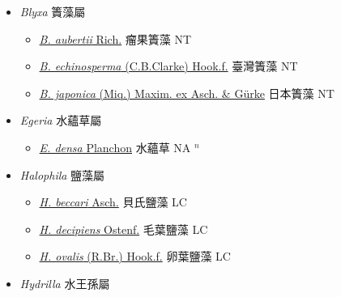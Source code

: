 
  \begin{itemize}
 \item[] \textit{Blyxa} 簀藻屬
                    
  \begin{itemize}
        \item[] \href{http://www.theplantlist.org/tpl1.1/search?q=Blyxa+aubertii}{\textit{B. aubertii} Rich.}   瘤果簀藻 NT
        \item[] \href{http://www.theplantlist.org/tpl1.1/search?q=Blyxa+echinosperma}{\textit{B. echinosperma} (C.B.Clarke) Hook.f.}   臺灣簀藻 NT
        \item[] \href{http://www.theplantlist.org/tpl1.1/search?q=Blyxa+japonica}{\textit{B. japonica} (Miq.) Maxim. ex Asch. \& Gürke}   日本簀藻 NT
  \end{itemize}
 \item[] \textit{Egeria} 水蘊草屬
                    
  \begin{itemize}
        \item[] \href{http://www.theplantlist.org/tpl1.1/search?q=Egeria+densa}{\textit{E. densa} Planchon}   水蘊草 NA $^n$
  \end{itemize}
 \item[] \textit{Halophila} 鹽藻屬
                    
  \begin{itemize}
        \item[] \href{http://www.theplantlist.org/tpl1.1/search?q=Halophila+beccari}{\textit{H. beccari} Asch.}   貝氏鹽藻 LC
        \item[] \href{http://www.theplantlist.org/tpl1.1/search?q=Halophila+decipiens}{\textit{H. decipiens} Ostenf.}   毛葉鹽藻 LC
        \item[] \href{http://www.theplantlist.org/tpl1.1/search?q=Halophila+ovalis}{\textit{H. ovalis} (R.Br.) Hook.f.}   卵葉鹽藻 LC
  \end{itemize}
 \item[] \textit{Hydrilla} 水王孫屬
                    

\end{itemize}
